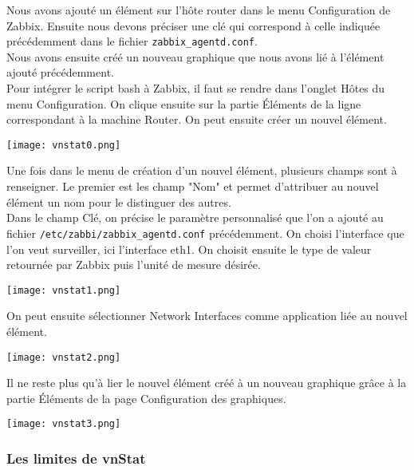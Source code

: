 			Nous avons ajouté un élément sur l'hôte router dans le menu Configuration de Zabbix. Ensuite nous devons préciser une clé qui correspond à celle indiquée précédemment dans le fichier \verb?zabbix_agentd.conf?.\\

			Nous avons ensuite créé un nouveau graphique que nous avons lié à l'élément ajouté précédemment.\\
			Pour intégrer le script bash à Zabbix, il faut se rendre dans l'onglet Hôtes du menu Configuration. On clique ensuite sur la partie Éléments de la ligne correspondant à la machine Router. On peut ensuite créer un nouvel élément.			

			\begin{center}
            	\texttt{[image: vnstat0.png]}
			\end{center}
			
			Une fois dans le menu de création d'un nouvel élément, plusieurs champs sont à renseigner. Le premier est les champ "Nom" et permet d'attribuer au nouvel élément un nom pour le distinguer des autres. \\
			Dans le champ Clé, on précise le paramètre personnalisé que l'on a ajouté au fichier \verb?/etc/zabbi/zabbix_agentd.conf? précédemment. On choisi l'interface que l'on veut surveiller, ici l'interface eth1. On choisit ensuite le type de valeur retournée par Zabbix puis l'unité de mesure désirée.
			\begin{center}
            	\texttt{[image: vnstat1.png]}
			\end{center}
			
			On peut ensuite sélectionner Network Interfaces comme application liée au nouvel élément.
			
			\begin{center}
            	\texttt{[image: vnstat2.png]}
       		\end{center}
			
			Il ne reste plus qu'à lier le nouvel élément créé à un nouveau graphique grâce à la partie Éléments de la page Configuration des graphiques.

			\begin{center}
            	 \texttt{[image: vnstat3.png]}
         	\end{center}
			

		\subsubsection{Les limites de vnStat}
			\vspace{0.3cm}

